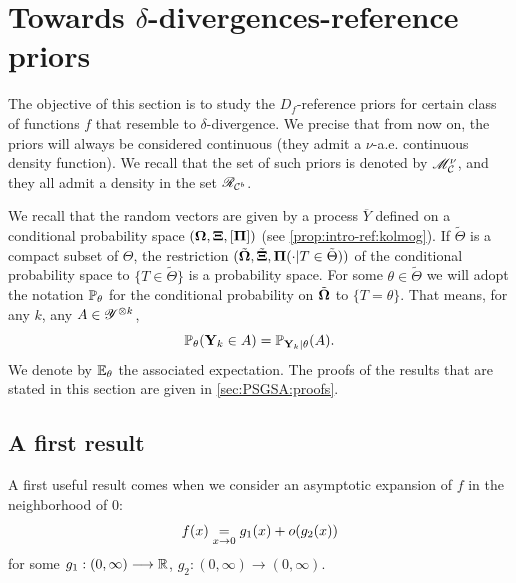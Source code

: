 \section{Towards $\delta$-divergences-reference priors}
\label{sec:PSGSA:towardsdelta}

The objective of this section is to study the $D_f$-reference priors for certain class of functions $f$ that resemble to $\delta$-divergence.
We precise that from now on, the priors will always be considered continuous (they admit a $\nu$-a.e. continuous density function). We recall that the set of such priors is denoted by $\mathscr{M}^\nu_{\mathcal{C}} $, and they all admit a density in the set $\mathscr{R}_{\mathcal{C}^b}$. %

We recall that the random vectors are given by a process $\overline{Y}$ defined on a conditional probability space $(\mathbf{\Omega},\mathbf{\Xi},[\mathbf{\Pi}] )$ (see \cref{prop:intro-ref:kolmog}). If $\tilde\Theta$ is a compact subset of $\Theta$, the restriction $(\tilde{\mathbf{\Omega}},\tilde{\mathbf{\Xi}}, \mathbf{\Pi}(\cdot|T\in\tilde\Theta))$ of the conditional probability space to $\{T\in\tilde\Theta\}$ is a probability space.
For some $\theta\in\tilde\Theta$ we will adopt the notation $\mathbb{P}_\theta$ for the conditional probability on $\tilde{\mathbf{\Omega}}$ to $\{T=\theta\}$. That means, for any $k$, any $A\in\mathscr{Y}^{\otimes k}$, 
    \begin{equation}
        \mathbb{P}_\theta(\mathbf{Y}_k\in A) = \mathbb{P}_{\mathbf{Y}_k|\theta}(A).
    \end{equation}
We denote by $\mathbb{E}_\theta$ the associated expectation.
The proofs of the results that are stated in this section are given in \cref{sec:PSGSA:proofs}.


\subsection{A first result}

A first useful result comes when we consider an asymptotic expansion of $f$ in the neighborhood of $0$:
\begin{equation}
    f(x) \overset{}{\underset{x\rightarrow0}{=}} g_1(x) + o(g_2(x))
\end{equation}
for some $g_1:(0,\infty)\longrightarrow\mathbb{R}$, $g_2:(0,\infty)\to(0,\infty)$.


